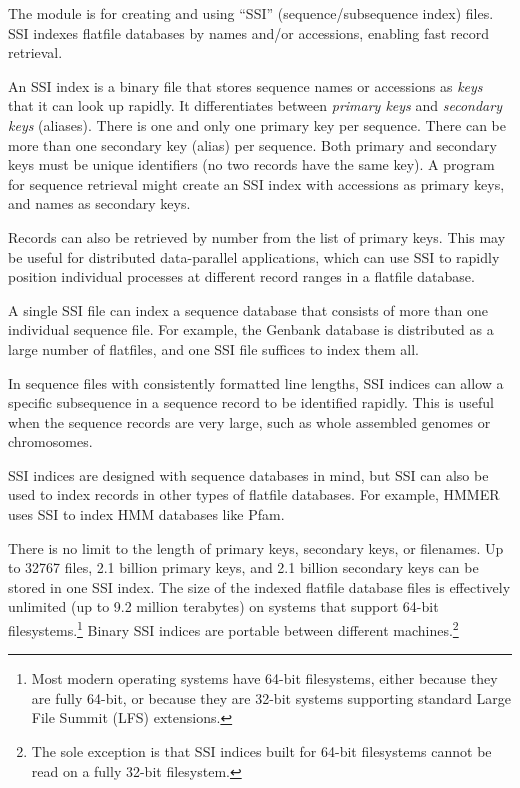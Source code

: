 
The  module is for creating and using ``SSI''
(sequence/subsequence index) files. SSI indexes flatfile databases by
names and/or accessions, enabling fast record retrieval.

An SSI index is a binary file that stores sequence names or accessions
as \emph{keys} that it can look up rapidly. It differentiates between
\emph{primary keys} and \emph{secondary keys} (aliases).  There is one
and only one primary key per sequence. There can be more than one
secondary key (alias) per sequence. Both primary and secondary keys
must be unique identifiers (no two records have the same key).  A
program for sequence retrieval might create an SSI index with
accessions as primary keys, and names as secondary keys.

Records can also be retrieved by number from the list of primary keys.
This may be useful for distributed data-parallel applications, which
can use SSI to rapidly position individual processes at different
record ranges in a flatfile database.

A single SSI file can index a sequence database that consists of more
than one individual sequence file. For example, the Genbank database
is distributed as a large number of flatfiles, and one SSI file
suffices to index them all.

In sequence files with consistently formatted line lengths, SSI
indices can allow a specific subsequence in a sequence record to be
identified rapidly. This is useful when the sequence records are very
large, such as whole assembled genomes or chromosomes.

SSI indices are designed with sequence databases in mind, but SSI can
also be used to index records in other types of flatfile
databases. For example, HMMER uses SSI to index HMM databases like
Pfam.

There is no limit to the length of primary keys, secondary keys, or
filenames. Up to 32767 files, 2.1 billion primary keys, and 2.1
billion secondary keys can be stored in one SSI index. The size of the
indexed flatfile database files is effectively unlimited (up to 9.2
million terabytes) on systems that support 64-bit
filesystems.\footnote{Most modern operating systems have 64-bit
filesystems, either because they are fully 64-bit, or because they are
32-bit systems supporting standard Large File Summit (LFS)
extensions.} Binary SSI indices are portable between different
machines.\footnote{The sole exception is that SSI indices built for
64-bit filesystems cannot be read on a fully 32-bit filesystem.}

